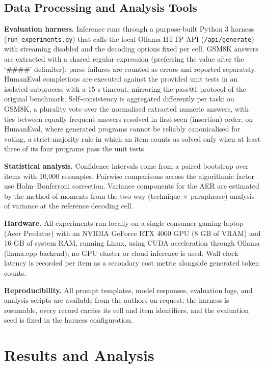 \documentclass[conference]{IEEEtran}
\begin{document}
\subsection{Data Processing and Analysis Tools}
\label{sec:method-tools}

\textbf{Evaluation harness.}  Inference runs through a purpose-built
Python 3 harness (\texttt{run\_experiments.py}) that calls the local
Ollama HTTP API (\texttt{/api/generate}) with streaming disabled and
the decoding options fixed per cell.  GSM8K answers are extracted with
a shared regular expression (preferring the value after the
`\#\#\#\#' delimiter); parse failures are counted as errors and
reported separately.  HumanEval completions are executed against the
provided unit tests in an isolated subprocess with a 15 s timeout,
mirroring the pass@1 protocol of the original benchmark.  Self-consistency
is aggregated differently per task: on GSM8K, a plurality vote over
the normalised extracted numeric answers, with ties between equally
frequent answers resolved in first-seen (insertion) order; on
HumanEval, where generated programs cannot be reliably canonicalised
for voting, a strict-majority rule in which an item counts as solved
only when at least three of its four programs pass the unit tests.

\textbf{Statistical analysis.}  Confidence intervals come from a
paired bootstrap over items with 10,000 resamples.  Pairwise
comparisons across the algorithmic factor use Holm--Bonferroni
correction.  Variance components for the AER are estimated by the
method of moments from the two-way (technique $\times$ paraphrase)
analysis of variance at the reference decoding cell.

\textbf{Hardware.}  All experiments run locally on a single consumer
gaming laptop (Acer Predator) with an NVIDIA GeForce RTX 4060 GPU
(8 GB of VRAM) and 16 GB of system RAM, running Linux, using CUDA
acceleration through Ollama (llama.cpp backend); no GPU cluster or
cloud inference is used.  Wall-clock latency is recorded per item as
a secondary cost metric alongside generated token counts.

\textbf{Reproducibility.}  All prompt templates, model responses,
evaluation logs, and analysis scripts are available from the authors
on request; the harness is resumable, every record carries its cell
and item identifiers, and the evaluation seed is fixed in the harness
configuration.

\section{Results and Analysis}
\label{sec:results}
\end{document}
